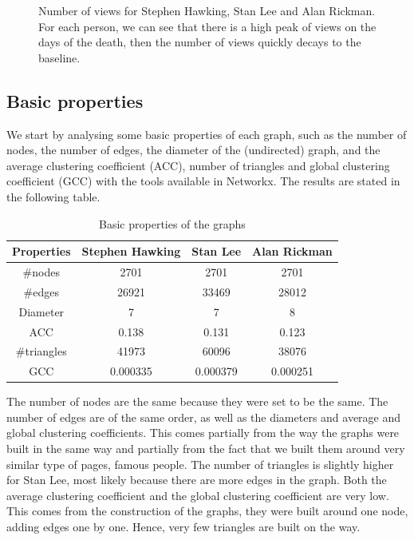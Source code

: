 \documentclass[conference]{IEEEtran}
\begin{document}
\begin{figure}[!htb]
\endminipage
\caption{Number of views for Stephen Hawking, Stan Lee and Alan Rickman. For each person, we can see that there is a high peak of views on the days of the death, then the number of views quickly decays to the baseline.  }
\end{figure}

\subsection{Basic properties}
We start by analysing some basic properties of each graph, such as the number of nodes, the number of edges, the diameter of the (undirected) graph, and the average clustering coefficient (ACC), number of triangles and global clustering coefficient (GCC) with the tools available in Networkx. The results are stated in the  following table. 


\begin{table}[htbp]
\caption{Basic properties of the graphs}
\begin{center}
\begin{tabular}{|c|c|c|c|}
\hline
 Properties & \textbf{Stephen Hawking}& \textbf{Stan Lee}& \textbf{Alan Rickman} \\
\hline
$\#$nodes& 2701 &  2701 & 2701 \\
\hline
$\#$edges & 26921 & 33469 & 28012  \\
\hline
Diameter & 7 & 7 &  8\\
\hline
ACC & 0.138 & 0.131 &  0.123\\
\hline
$\#$triangles  & 41973 & 60096 & 38076  \\
\hline
GCC & 0.000335 & 0.000379 & 0.000251 \\
\hline
\end{tabular}
\end{center}
\end{table}

The number of nodes are the same because they were set to be the same. The number of edges are of the same order, as well as the diameters and average and global clustering coefficients. This comes partially from the way the graphs were built in the same way and partially from the fact that we built them around very similar type of pages, famous people. The number of triangles is slightly higher for Stan Lee, most likely because there are more edges in the graph. Both the average clustering coefficient and the global clustering coefficient are very low. This comes from the construction of the graphs, they were built around one node, adding edges one by one. Hence, very few triangles are built on the way. 
\end{document}
